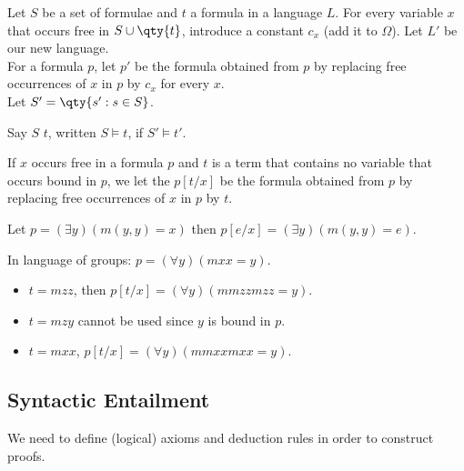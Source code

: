 Let $S$ be a set of formulae and $t$ a formula in a language $L$.
For every variable $x$ that occurs free in $S \cup \qty{t}$, introduce a constant $c_x$ (add it to $\Omega$).
Let $L'$ be our new language. \\
For a formula $p$, let $p'$ be the formula obtained from $p$ by replacing free occurrences of $x$ in $p$ by $c_x$ for every $x$. \\
Let $S' = \qty{s' : s \in S}$.

\begin{definition}
    Say $S$  $t$, written $S \models t$, if $S' \models t'$.
\end{definition}

\begin{definition}[Substitution]
    If $x$ occurs free in a formula $p$ and $t$ is a term that contains no variable that occurs bound in $p$, we let the  $p[t / x]$ be the formula obtained from $p$ by replacing free occurrences of $x$ in $p$ by $t$.
\end{definition}

\begin{example}
    Let $p = (\exists y)(m(y,y) = x)$ then $p[e/x] = (\exists y)(m(y,y) = e)$.
\end{example}

\begin{example}
    In language of groups:
    $p = (\forall y)(mxx = y)$.
    \begin{itemize}
        \item $t = mzz$, then $p[t / x] = (\forall y)(mmzzmzz = y)$.
        \item $t = mzy$ cannot be used since $y$ is bound in $p$.
        \item $t = mxx$, $p[t / x] = (\forall y)(mmxxmxx = y)$.
    \end{itemize}
\end{example}

\subsection{Syntactic Entailment}
We need to define (logical) axioms and deduction rules in order to construct proofs.

